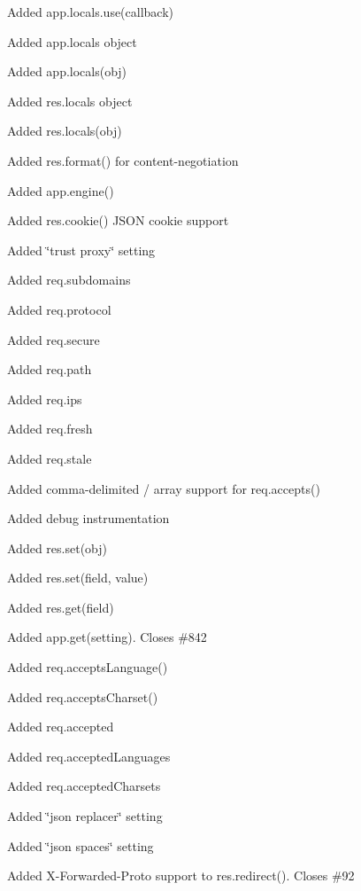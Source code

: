 {\ttfamily 
\begin{DoxyItemize}
\item Added {\ttfamily app.\+locals.\+use(callback)}
\item Added {\ttfamily app.\+locals} object
\item Added {\ttfamily app.\+locals(obj)}
\item Added {\ttfamily res.\+locals} object
\item Added {\ttfamily res.\+locals(obj)}
\item Added {\ttfamily res.\+format()} for content-\/negotiation
\item Added {\ttfamily app.\+engine()}
\item Added {\ttfamily res.\+cookie()} J\+S\+ON cookie support
\item Added \char`\"{}trust proxy\char`\"{} setting
\item Added {\ttfamily req.\+subdomains}
\item Added {\ttfamily req.\+protocol}
\item Added {\ttfamily req.\+secure}
\item Added {\ttfamily req.\+path}
\item Added {\ttfamily req.\+ips}
\item Added {\ttfamily req.\+fresh}
\item Added {\ttfamily req.\+stale}
\item Added comma-\/delimited / array support for {\ttfamily req.\+accepts()}
\item Added debug instrumentation
\item Added {\ttfamily res.\+set(obj)}
\item Added {\ttfamily res.\+set(field, value)}
\item Added {\ttfamily res.\+get(field)}
\item Added {\ttfamily app.\+get(setting)}. Closes \#842
\item Added {\ttfamily req.\+accepts\+Language()}
\item Added {\ttfamily req.\+accepts\+Charset()}
\item Added {\ttfamily req.\+accepted}
\item Added {\ttfamily req.\+accepted\+Languages}
\item Added {\ttfamily req.\+accepted\+Charsets}
\item Added \char`\"{}json replacer\char`\"{} setting
\item Added \char`\"{}json spaces\char`\"{} setting
\item Added X-\/\+Forwarded-\/\+Proto support to {\ttfamily res.\+redirect()}. Closes \#92

\end{DoxyItemize}}
